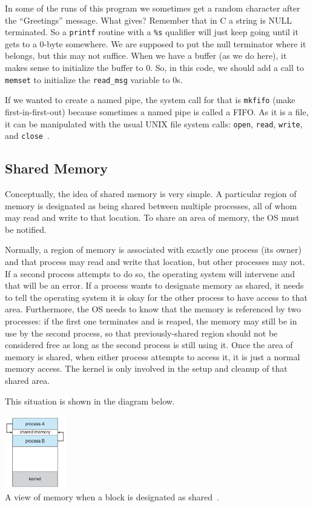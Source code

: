 In some of the runs of this program we sometimes get a random character after the ``Greetings'' message. What gives? Remember that in C a string is NULL terminated. So a \texttt{printf} routine with a \texttt{\%s} qualifier will just keep going until it gets to a 0-byte somewhere. We are supposed to put the null terminator where it belongs, but this may not suffice. When we have a buffer (as we do here), it makes sense to initialize the buffer to 0. So, in this code, we should add a call to \texttt{memset} to initialize the \texttt{read\_msg} variable to 0s.

If we wanted to create a named pipe, the system call for that is \texttt{mkfifo} (make first-in-first-out) because sometimes a named pipe is called a FIFO. As it is a file, it can be manipulated with the usual UNIX file system calls: \texttt{open}, \texttt{read}, \texttt{write}, and \texttt{close}~\cite{osc}.


\subsection*{Shared Memory}
Conceptually, the idea of shared memory is very simple. A particular region of memory is designated as being shared between multiple processes, all of whom may read and write to that location. To share an area of memory, the OS must be notified.

Normally, a region of memory is associated with exactly one process (its owner) and that process may read and write that location, but other processes may not. If a second process attempts to do so, the operating system will intervene and that will be an error. If a process wants to designate memory as shared, it needs to tell the operating system it is okay for the other process to have access to that area. Furthermore, the OS needs to know that the memory is referenced by two processes: if the first one terminates and is reaped, the memory may still be in use by the second process, so that previously-shared region should not be considered free as long as the second process is still using it. Once the area of memory is shared, when either process attempts to access it, it is just a normal memory access. The kernel is only involved in the setup and cleanup of that shared area.

This situation is shown in the diagram below.

\begin{center}
	\includegraphics[width=0.2\textwidth]{images/shared-memory.png}\\
	A view of memory when a block is designated as shared~\cite{osc}.
\end{center}

